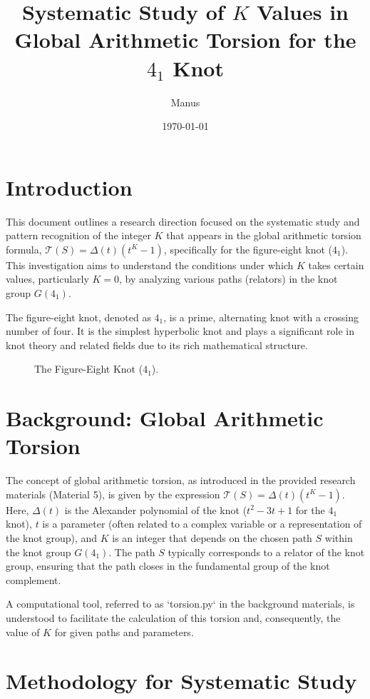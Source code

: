 \documentclass{article}
\title{Systematic Study of $K$ Values in Global Arithmetic Torsion for the $4_1$ Knot}
\author{Manus}
\date{\today}
\begin{document}
\maketitle

\section{Introduction}
This document outlines a research direction focused on the systematic study and pattern recognition of the integer $K$ that appears in the global arithmetic torsion formula, $\mathcal{T}(S) = \Delta(t)(t^K-1)$, specifically for the figure-eight knot ($4_1$). This investigation aims to understand the conditions under which $K$ takes certain values, particularly $K=0$, by analyzing various paths (relators) in the knot group $G(4_1)$.

The figure-eight knot, denoted as $4_1$, is a prime, alternating knot with a crossing number of four. It is the simplest hyperbolic knot and plays a significant role in knot theory and related fields due to its rich mathematical structure.

\begin{figure}[h!]
    \centering
    
    \caption{The Figure-Eight Knot ($4_1$).}
    \label{fig:knot_4_1}
\end{figure}

\section{Background: Global Arithmetic Torsion}
The concept of global arithmetic torsion, as introduced in the provided research materials (Material 5), is given by the expression $\mathcal{T}(S) = \Delta(t)(t^K-1)$. Here, $\Delta(t)$ is the Alexander polynomial of the knot ($t^2 - 3t + 1$ for the $4_1$ knot), $t$ is a parameter (often related to a complex variable or a representation of the knot group), and $K$ is an integer that depends on the chosen path $S$ within the knot group $G(4_1)$. The path $S$ typically corresponds to a relator of the knot group, ensuring that the path closes in the fundamental group of the knot complement.

A computational tool, referred to as `torsion.py` in the background materials, is understood to facilitate the calculation of this torsion and, consequently, the value of $K$ for given paths and parameters.

\section{Methodology for Systematic Study}
\end{document}
